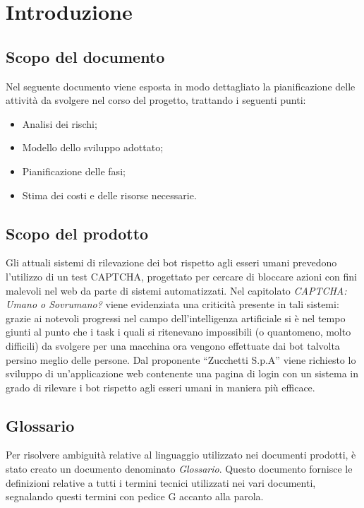 \section{Introduzione}

\subsection{Scopo del documento}
Nel seguente documento viene esposta in modo dettagliato la pianificazione delle attività da svolgere nel corso del progetto, trattando i seguenti punti:
\begin{itemize}
	\item Analisi dei rischi;
	\item Modello dello sviluppo adottato;
	\item Pianificazione delle fasi;
	\item Stima dei costi e delle risorse necessarie.
\end{itemize}

\subsection{Scopo del prodotto}
Gli attuali sistemi di rilevazione dei bot rispetto agli esseri umani prevedono l'utilizzo di un test CAPTCHA, progettato per cercare di bloccare azioni con fini malevoli nel web da parte di sistemi automatizzati. Nel capitolato \textit{CAPTCHA: Umano o Sovrumano?} viene evidenziata una criticità presente in tali sistemi: grazie ai notevoli progressi nel campo dell’intelligenza artificiale si è nel tempo giunti al punto che i task i quali si ritenevano impossibili (o quantomeno, molto difficili) da svolgere per una macchina ora vengono effettuate dai bot talvolta persino meglio delle persone.
Dal proponente “Zucchetti S.p.A” viene richiesto lo sviluppo di un'applicazione web contenente una pagina di login con un sistema in grado di rilevare i bot rispetto agli esseri umani in maniera più efficace.

\subsection{Glossario}
Per risolvere ambiguità relative al linguaggio utilizzato nei documenti prodotti, è stato creato un documento denominato \textit{Glossario}. Questo documento fornisce le definizioni relative a tutti i termini tecnici utilizzati nei vari documenti, segnalando questi termini con pedice G accanto alla parola.

